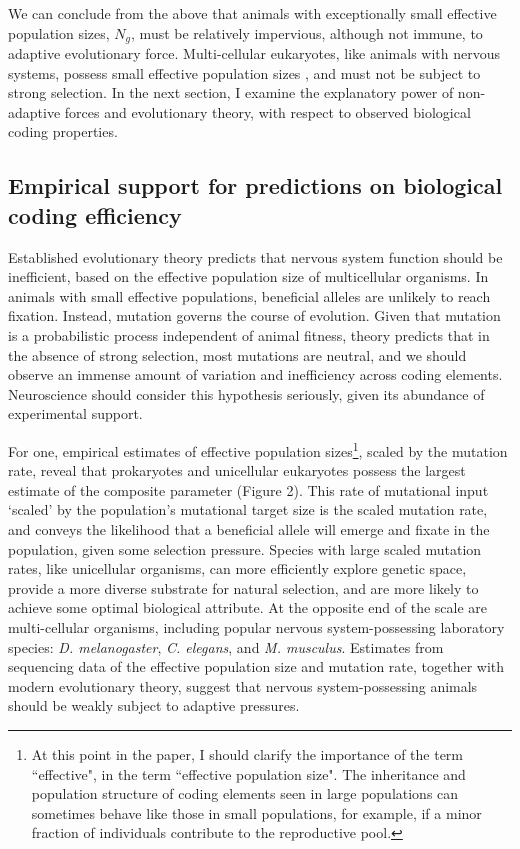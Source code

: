 \documentclass[twocolumn]{article}
\begin{document}
We can conclude from the above that animals with exceptionally small effective population sizes, $N_g$, must be relatively impervious, although not immune, to adaptive evolutionary force. Multi-cellular eukaryotes, like animals with nervous systems, possess small effective population sizes \cite{Lynch_Conery_2003}, and must not be subject to strong selection. In the next section, I examine the explanatory power of non-adaptive forces and evolutionary theory, with respect to observed biological coding properties. 


\subsection{Empirical support for predictions on biological coding efficiency}

Established evolutionary theory predicts that nervous system function should be inefficient, based on the effective population size of multicellular organisms. In animals with small effective populations, beneficial alleles are unlikely to reach fixation. Instead, mutation governs the course of evolution. Given that mutation is a probabilistic process independent of animal fitness, theory predicts that in the absence of strong selection, most mutations are neutral, and we should observe an immense amount of variation and inefficiency across coding elements. Neuroscience should consider this hypothesis seriously, given its abundance of experimental support. 

For one, empirical estimates of effective population sizes\footnote{At this point in the paper, I should clarify the importance of the term ``effective", in the term ``effective population size". The inheritance and population structure of coding elements seen in large populations can sometimes behave like those in small populations, for example, if a minor fraction of individuals contribute to the reproductive pool.}, scaled by the mutation rate, reveal that prokaryotes and unicellular eukaryotes possess the largest estimate of the composite parameter (Figure 2). This rate of mutational input `scaled' by the population's mutational target size is the scaled mutation rate, and conveys the likelihood that a beneficial allele will emerge and fixate in the population, given some selection pressure. Species with large scaled mutation rates, like unicellular organisms, can more efficiently explore genetic space, provide a more diverse substrate for natural selection, and are more likely to achieve some optimal biological attribute. At the opposite end of the scale are multi-cellular organisms, including popular nervous system-possessing laboratory species: \textit{D. melanogaster}, \textit{C. elegans}, and \textit{M. musculus}. Estimates from sequencing data of the effective population size and mutation rate, together with modern evolutionary theory, suggest that nervous system-possessing animals should be weakly subject to adaptive pressures. 
\end{document}
